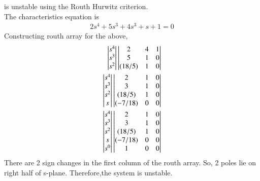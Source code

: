 \begin{enumerate}[label=\thesection.\arabic*.,ref=\thesection.\theenumi]
%
is unstable using the Routh Hurwitz criterion.
\\
\solution 
The characteristics equation is 
\begin{align}
2s^4 + 5s^3 + 4s^3 + s + 1 = 0 
\end{align}
Constructing routh array for the above,
\begin{align}
\begin{vmatrix}s^4\\s^3\\s^2\end{vmatrix}
\begin{vmatrix}2 & 4 & 1 \\ 5 & 1 & 0 \\ (18/5) & 1 & 0\end{vmatrix}
\\
\begin{vmatrix}s^4\\s^3\\s^2\\s\end{vmatrix}
\begin{vmatrix}2 & 1 & 0 \\ 3 & 1 & 0 \\ (18/5) & 1 & 0 \\ (-7/18) & 0 & 0\end{vmatrix}
\\
\begin{vmatrix}s^4\\s^3\\s^2\\s\\s^0\end{vmatrix}
\begin{vmatrix}2 & 1 & 0 \\ 3 & 1 & 0 \\ (18/5) & 1 & 0 \\ (-7/18) & 0 & 0 \\ 1 & 0 & 0\end{vmatrix}
\end{align}
%
There are 2 sign changes in the first column of the routh array. So, 2 poles lie on right half of s-plane.
Therefore,the system is unstable.
%
\end{enumerate}


